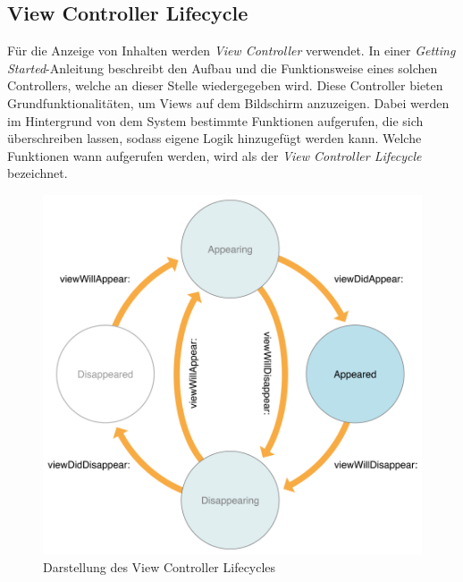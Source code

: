 \subsection{View Controller Lifecycle}
Für die Anzeige von Inhalten werden \textit{View Controller} verwendet.
In einer \textit{Getting Started}-Anleitung beschreibt \textcite{APP2016} den Aufbau und die Funktionsweise eines solchen Controllers, welche an dieser Stelle wiedergegeben wird.
Diese Controller bieten Grundfunktionalitäten, um Views auf dem Bildschirm anzuzeigen.
Dabei werden im Hintergrund von dem System bestimmte Funktionen aufgerufen, die sich überschreiben lassen, sodass eigene Logik hinzugefügt werden kann.
Welche Funktionen wann aufgerufen werden, wird als der \textit{View Controller Lifecycle} bezeichnet.
\begin{figure}[h!]
	\centering
	\includegraphics[scale=0.5]{images/view-controller-lifecycle}
	\caption{Darstellung des View Controller Lifecycles \parencite{APP2016}}
	\label{fig:view-controller-lifecycle}
\end{figure}
